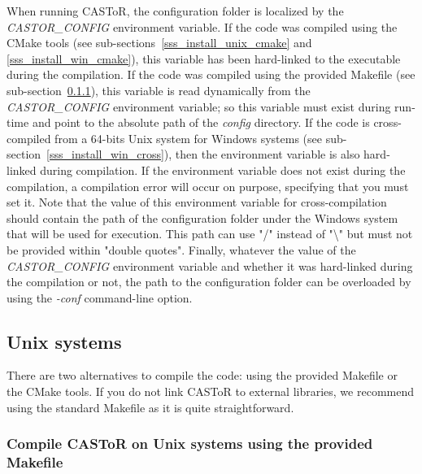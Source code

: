 \documentclass[a4paper, 11pt]{article}
\begin{document}
When running CASToR, the configuration folder is localized by the \textit{CASTOR\_CONFIG} environment variable. If the code was compiled using the CMake
tools (see sub-sections~\ref{sss_install_unix_cmake} and \ref{sss_install_win_cmake}), this variable has been hard-linked to the executable during the
compilation. If the code was compiled using the provided Makefile (see sub-section~\ref{sss_install_unix_makefile}), this variable is read dynamically
from the \textit{CASTOR\_CONFIG} environment variable; so this variable must exist during run-time and point to the absolute path of the \textit{config}
directory. If the code is cross-compiled from a 64-bits Unix system for Windows systems (see sub-section~\ref{sss_install_win_cross}), then the environment
variable is also hard-linked during compilation. If the environment variable does not exist during the compilation, a compilation error will occur on purpose,
specifying that you must set it. Note that the value of this environment variable for cross-compilation should contain the path of the configuration folder
under the Windows system that will be used for execution. This path can use "/" instead of "\textbackslash" but must not be provided within "double quotes".
Finally, whatever the value of the \textit{CASTOR\_CONFIG} environment variable and whether it was hard-linked during the compilation or not, the path to
the configuration folder can be overloaded by using the \textit{-conf} command-line option.

\subsection{Unix systems}
\label{ss_install_unix}

There are two alternatives to compile the code: using the provided Makefile or the CMake tools.
If you do not link CASToR to external libraries, we recommend using the standard Makefile as it is quite straightforward.

\subsubsection{Compile CASToR on Unix systems using the provided Makefile}
\label{sss_install_unix_makefile}
\end{document}
